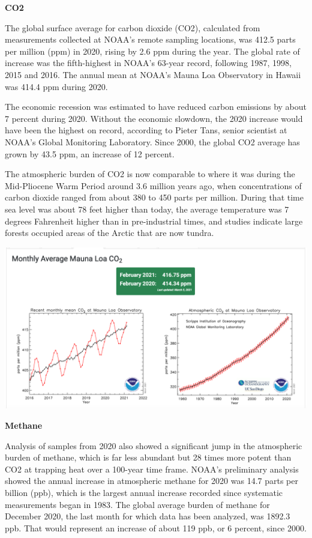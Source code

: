 \documentclass[
]{book}
\begin{document}
\textbf{CO2}

The global surface average for carbon dioxide (CO2), calculated from measurements collected at NOAA's remote sampling locations, was 412.5 parts per million (ppm) in 2020, rising by 2.6 ppm during the year. The global rate of increase was the fifth-highest in NOAA's 63-year record, following 1987, 1998, 2015 and 2016. The annual mean at NOAA's Mauna Loa Observatory in Hawaii was 414.4 ppm during 2020.

The economic recession was estimated to have reduced carbon emissions by about 7 percent during 2020. Without the economic slowdown, the 2020 increase would have been the highest on record, according to Pieter Tans, senior scientist at NOAA's Global Monitoring Laboratory. Since 2000, the global CO2 average has grown by 43.5 ppm, an increase of 12 percent.

The atmospheric burden of CO2 is now comparable to where it was during the Mid-Pliocene Warm Period around 3.6 million years ago, when concentrations of carbon dioxide ranged from about 380 to 450 parts per million. During that time sea level was about 78 feet higher than today, the average temperature was 7 degrees Fahrenheit higher than in pre-industrial times, and studies indicate large forests occupied areas of the Arctic that are now tundra.

\includegraphics{fig/monthly-avg-co2-mlo.png}

\textbf{Methane}

Analysis of samples from 2020 also showed a significant jump in the atmospheric burden of methane, which is far less abundant but 28 times more potent than CO2 at trapping heat over a 100-year time frame. NOAA's preliminary analysis showed the annual increase in atmospheric methane for 2020 was 14.7 parts per billion (ppb), which is the largest annual increase recorded since systematic measurements began in 1983. The global average burden of methane for December 2020, the last month for which data has been analyzed, was 1892.3 ppb. That would represent an increase of about 119 ppb, or 6 percent, since 2000.
\end{document}
